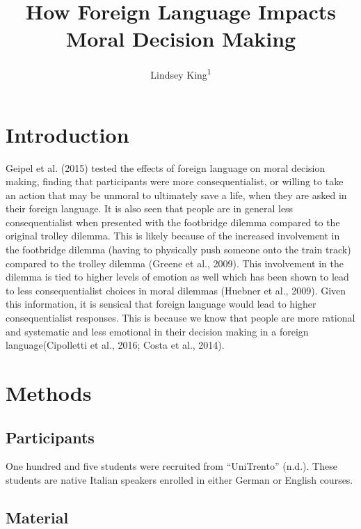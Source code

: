 \documentclass[
  man,floatsintext]{apa7}
\title{How Foreign Language Impacts Moral Decision Making}
\author{Lindsey King\textsuperscript{1}}
\date{}
\affiliation{\vspace{0.5cm}\textsuperscript{1} University of Chicago}
\begin{document}
\maketitle

\hypertarget{introduction}{%
\section{Introduction}\label{introduction}}

Geipel et al. (2015) tested the effects of foreign language on moral decision making, finding that participants were more consequentialist, or willing to take an action that may be unmoral to ultimately save a life, when they are asked in their foreign language. It is also seen that people are in general less consequentialist when presented with the footbridge dilemma compared to the original trolley dilemma. This is likely because of the increased involvement in the footbridge dilemma (having to physically push someone onto the train track) compared to the trolley dilemma (Greene et al., 2009). This involvement in the dilemma is tied to higher levels of emotion as well which has been shown to lead to less consequentialist choices in moral dilemmas (Huebner et al., 2009). Given this information, it is sensical that foreign language would lead to higher consequentialist responses. This is because we know that people are more rational and systematic and less emotional in their decision making in a foreign language(Cipolletti et al., 2016; Costa et al., 2014).

\hypertarget{methods}{%
\section{Methods}\label{methods}}

\hypertarget{participants}{%
\subsection{Participants}\label{participants}}

One hundred and five students were recruited from {``{UniTrento}''} (n.d.). These students are native Italian speakers enrolled in either German or English courses.

\hypertarget{material}{%
\subsection{Material}\label{material}}
\end{document}
